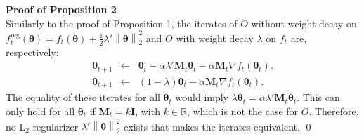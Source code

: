 \documentclass[usenames,dvipsnames]{article} %
\newcommand{\norm}[1]{\left\lVert#1\right\rVert}
\newtheorem{prop}{Proposition}
\begin{document}
%

\noindent{}\textbf{Proof of Proposition 2}\\
Similarly to the proof of Proposition 1, the iterates of $O$ without weight decay on $f^{\text{reg}}_t(\bm{\theta}) = f_t(\bm{\theta}) + \frac{1}{2}  \lambda' \norm{\bm{\theta}}_2^2$ and $O$ with weight decay $\lambda$ on $f_t$ are, respectively:
\begin{eqnarray}
\label{eq:adgrl2}
\bm{\theta}_{t+1} &\leftarrow& \bm{\theta}_t - \alpha  \lambda' \mathbf{M}_t \bm{\theta}_t - \alpha \mathbf{M}_t \nabla f_t(\bm{\theta}_t).\\
\label{eq:adgr_wd}
\bm{\theta}_{t+1} &\leftarrow& (1 - \lambda) \bm{\theta}_t - \alpha \mathbf{M}_t \nabla f_t(\bm{\theta}_t).
\end{eqnarray}
The equality of these iterates for all $\bm{\theta}_t$ would imply
$\lambda\bm{\theta}_t = \alpha  \lambda' \mathbf{M}_t\bm{\theta}_t$.
This can only hold for all $\bm{\theta}_t$ if $\mathbf{M}_t = k \mathbf{I}$, with $k\in\mathbb{R}$, which is not the case for $O$. Therefore, no L$_2$ regularizer $\lambda' \norm{\bm{\theta}}_2^2$ exists that makes the iterates equivalent.
\qed

\end{document}

